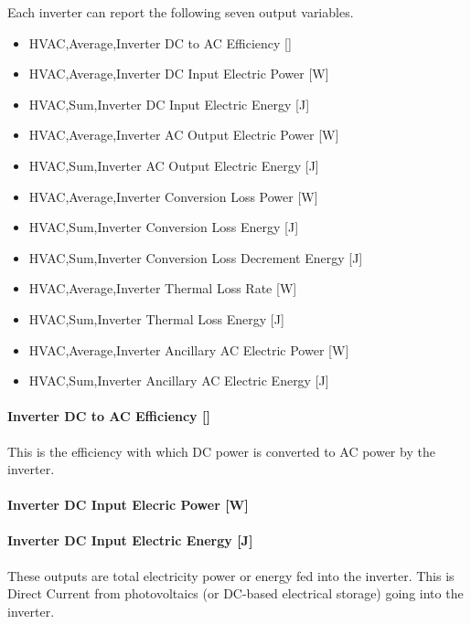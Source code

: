 Each inverter can report the following seven output variables.

\begin{itemize}
\tightlist
\item
  HVAC,Average,Inverter DC to AC Efficiency {[]}
\item
  HVAC,Average,Inverter DC Input Electric Power {[}W{]}
\item
  HVAC,Sum,Inverter DC Input Electric Energy {[}J{]}
\item
  HVAC,Average,Inverter AC Output Electric Power {[}W{]}
\item
  HVAC,Sum,Inverter AC Output Electric Energy {[}J{]}
\item
  HVAC,Average,Inverter Conversion Loss Power {[}W{]}
\item
  HVAC,Sum,Inverter Conversion Loss Energy {[}J{]}
\item
  HVAC,Sum,Inverter Conversion Loss Decrement Energy {[}J{]}
\item
  HVAC,Average,Inverter Thermal Loss Rate {[}W{]}
\item
  HVAC,Sum,Inverter Thermal Loss Energy {[}J{]}
\item
  HVAC,Average,Inverter Ancillary AC Electric Power {[}W{]}
\item
  HVAC,Sum,Inverter Ancillary AC Electric Energy {[}J{]}
\end{itemize}

\paragraph{Inverter DC to AC Efficiency {[]}}\label{inverter-dc-to-ac-efficiency}

This is the efficiency with which DC power is converted to AC power by the inverter.

\paragraph{Inverter DC Input Elecric Power {[}W{]}}\label{inverter-dc-input-elecric-power-w}

\paragraph{Inverter DC Input Electric Energy {[}J{]}}\label{inverter-dc-input-electric-energy-j}

These outputs are total electricity power or energy fed into the inverter. This is Direct Current from photovoltaics (or DC-based electrical storage) going into the inverter.


